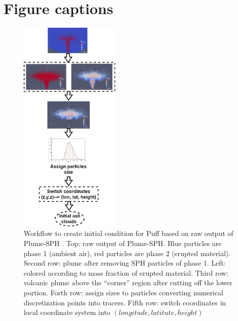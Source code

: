 \documentclass[utf8]{frontiersSCNS} %
\begin{document}



\section*{Figure captions}
\begin{figure}
\center
\includegraphics[width=0.43\textwidth]{Figures/Creat_initial_Ash}
\caption{Workflow to create initial condition for Puff based on raw output of Plume-SPH \citep{cao2018plume}. Top: raw output of Plume-SPH. Blue particles are phase 1 (ambient air), red particles are phase 2 (erupted material). Second row: plume after removing SPH particles of phase 1. Left: colored according to mass fraction of erupted material. Third row: volcanic plume above the ``corner'' region after cutting off the lower portion. Forth row: assign sizes to particles converting numerical discretization points into tracers. Fifth row: switch coordinates in local coordinate system into $(longitude, latitute, height)$}
\label{fig:create-initial-ash-plume-sph}
\end{figure}
\end{document}
